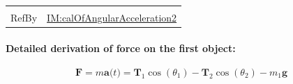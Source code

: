 \documentclass[12pt]{article}
\begin{document}
\begin{minipage}{\textwidth}
\begin{tabular}{>{\raggedright}p{}>{\raggedright\arraybackslash}p{}}
\\ \midrule \\
RefBy & \hyperref[IM:calOfAngularAcceleration2]{IM:calOfAngularAcceleration2}
        
\\ \bottomrule
\end{tabular}
\end{minipage}
\paragraph{Detailed derivation of force on the first object:}
\label{GD:yForce1Deriv}
\begin{displaymath}
\symbf{F}=m \symbf{a}\text{(}t\text{)}={\symbf{T}_{1}} \cos\left({θ_{1}}\right)-{\symbf{T}_{2}} \cos\left({θ_{2}}\right)-{m_{1}} \symbf{g}
\end{displaymath}
\vspace{\baselineskip}
\noindent
\end{document}
